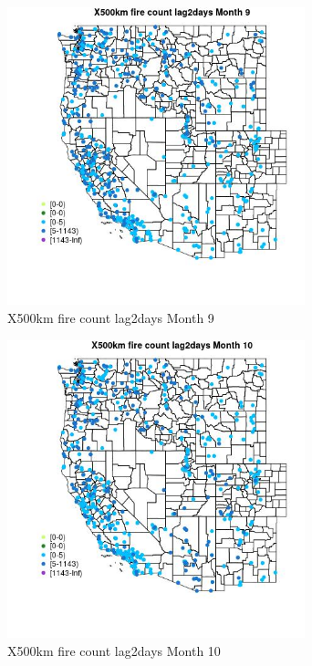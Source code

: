 \begin{figure} 
\centering  
\includegraphics[width=0.77\textwidth]{Code_Outputs/Report_ML_input_PM25_Step4_part_e_de_duplicated_aves_compiled_2019-05-14wNAs_MapObsMo9X500km_fire_count_lag2days.jpg} 
\caption{\label{fig:Report_ML_input_PM25_Step4_part_e_de_duplicated_aves_compiled_2019-05-14wNAsMapObsMo9X500km_fire_count_lag2days}X500km fire count lag2days Month 9} 
\end{figure} 
 

\begin{figure} 
\centering  
\includegraphics[width=0.77\textwidth]{Code_Outputs/Report_ML_input_PM25_Step4_part_e_de_duplicated_aves_compiled_2019-05-14wNAs_MapObsMo10X500km_fire_count_lag2days.jpg} 
\caption{\label{fig:Report_ML_input_PM25_Step4_part_e_de_duplicated_aves_compiled_2019-05-14wNAsMapObsMo10X500km_fire_count_lag2days}X500km fire count lag2days Month 10} 
\end{figure} 
 

